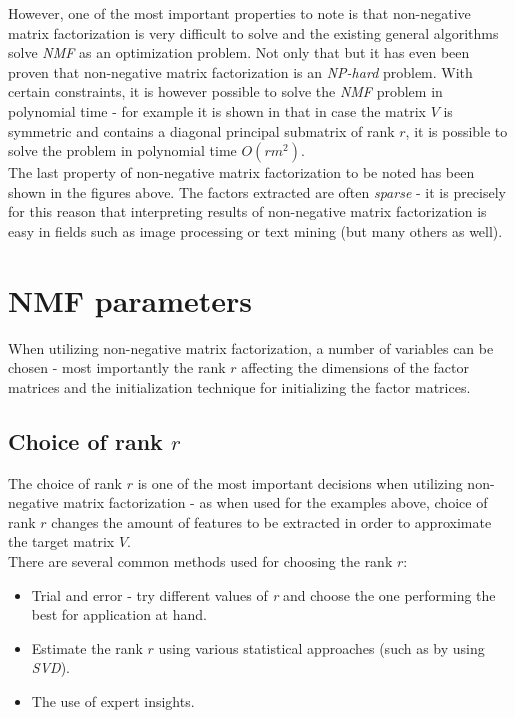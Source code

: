\documentclass[thesis=M,english]{FITthesis}[2012/10/20]
\begin{document}
However, one of the most important properties to note is that non-negative matrix
factorization is very difficult to solve and the existing general algorithms
solve \emph{NMF} as an optimization problem. Not only that but it has even been
proven that non-negative matrix factorization is an \emph{NP-hard} problem.\cite{nmf-nphard}
With certain constraints, it is however possible to solve the \emph{NMF} problem
in polynomial time - for example it is shown in \cite{nmf-poly} that in case the
matrix $V$ is symmetric and contains a diagonal principal submatrix of rank $r$,
it is possible to solve the problem in polynomial time $O(rm^{2})$.
\\

The last property of non-negative matrix factorization to be noted has been
shown in the figures above. The factors extracted are often \emph{sparse} - it is
precisely for this reason that interpreting results of non-negative matrix
factorization is easy in fields such as image processing or text mining (but many
others as well).\cite{nmf-whyhow}

\section{NMF parameters}
When utilizing non-negative matrix factorization, a number of variables can
be chosen - most importantly the rank $r$ affecting the dimensions of the
factor matrices and the initialization technique for initializing the
factor matrices.

\subsection{Choice of rank $r$}
The choice of rank $r$ is one of the most important decisions when utilizing non-negative
matrix factorization - as when used for the examples above, choice of rank $r$
changes the amount of features to be extracted in order to approximate the target
matrix $V$.
\\

There are several common methods used for choosing the rank $r$:
\begin{itemize}
  \item Trial and error - try different values of \emph{r} and choose the one
        performing the best for application at hand.
  \item Estimate the rank $r$ using various statistical approaches (such as by
        using \emph{SVD}).
  \item The use of expert insights.
\end{itemize}\cite{nmf-whyhow}
\end{document}
